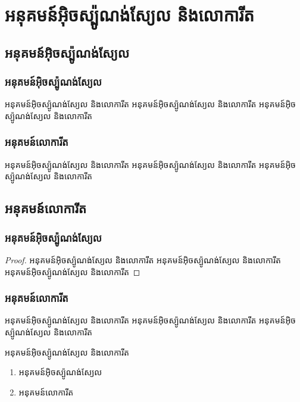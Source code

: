 \documentclass[10pt,a5paper,magenta]{xfive}
\begin{document}
	\chapter{អនុគមន៍អ៊ិចស្ប៉ូណង់ស្យែល និងលោការីត}
	\section{អនុគមន៍អ៊ិចស្ប៉ូណង់ស្យែល}
	\subsection{អនុគមន៍អ៊ិចស្ប៉ូណង់ស្យែល}
	\begin{definition}
		អនុគមន៍អ៊ិចស្ប៉ូណង់ស្យែល និងលោការីត អនុគមន៍អ៊ិចស្ប៉ូណង់ស្យែល និងលោការីត អនុគមន៍អ៊ិចស្ប៉ូណង់ស្យែល និងលោការីត
	\end{definition}
	\subsection{អនុគមន៍លោការីត}
	\begin{theorem}
		អនុគមន៍អ៊ិចស្ប៉ូណង់ស្យែល និងលោការីត អនុគមន៍អ៊ិចស្ប៉ូណង់ស្យែល និងលោការីត អនុគមន៍អ៊ិចស្ប៉ូណង់ស្យែល និងលោការីត
	\end{theorem}
	\section{អនុគមន៍លោការីត}
	\subsection{អនុគមន៍អ៊ិចស្ប៉ូណង់ស្យែល}
	\begin{proof}
		អនុគមន៍អ៊ិចស្ប៉ូណង់ស្យែល និងលោការីត អនុគមន៍អ៊ិចស្ប៉ូណង់ស្យែល និងលោការីត អនុគមន៍អ៊ិចស្ប៉ូណង់ស្យែល និងលោការីត
	\end{proof}
	\subsection{អនុគមន៍លោការីត}
	\begin{example}
		អនុគមន៍អ៊ិចស្ប៉ូណង់ស្យែល និងលោការីត អនុគមន៍អ៊ិចស្ប៉ូណង់ស្យែល និងលោការីត អនុគមន៍អ៊ិចស្ប៉ូណង់ស្យែល និងលោការីត
	\end{example}
	\begin{remark}
		អនុគមន៍អ៊ិចស្ប៉ូណង់ស្យែល និងលោការីត
		\begin{enumerate}[k]
			\item អនុគមន៍អ៊ិចស្ប៉ូណង់ស្យែល
			\item អនុគមន៍លោការីត
		\end{enumerate}
	\end{remark}
\end{document}
